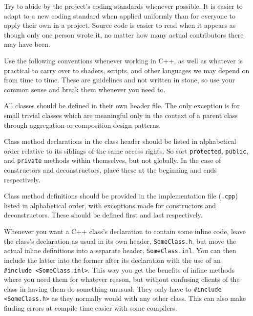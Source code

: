 

Try to abide by the project's coding standards whenever possible. It is easier to adapt to a new coding standard when applied uniformly than for everyone to apply their own in a project. Source code is easier to read when it appears as though only one person wrote it, no matter how many actual contributors there may have been.

Use the following conventions whenever working in C++, as well as whatever is practical to carry over to shaders, scripts, and other languages we may depend on from time to time. These are guidelines and not written in stone, so use your common sense and break them whenever you need to.


\startitemize[4]
\item
All classes should be defined in their own header file. The only exception is for small trivial classes which are meaningful only in the context of a parent class through aggregation or composition design patterns.

\item
Class method declarations in the class header should be listed in alphabetical order relative to its siblings of the same access rights. So sort {\tt protected}, {\tt public}, and {\tt private} methods within themselves, but not globally. In the case of constructors and deconstructors, place these at the beginning and ends respectively.

\item
Class method definitions should be provided in the implementation file ({\tt *.cpp}) listed in alphabetical order, with exceptions made for constructors and deconstructors. These should be defined first and last respectively.

\item
Whenever you want a C++ class's declaration to contain some inline code, leave the class's declaration as usual in its own header, {\tt SomeClass.h}, but move the actual inline definitions into a separate header, {\tt SomeClass.inl}. You can then include the latter into the former after its declaration with the use of an {\tt \#include <SomeClass.inl>}. This way you get the benefits of inline methods where you need them for whatever reason, but without confusing clients of the class in having them do something unusual. They only have to {\tt \#include <SomeClass.h>} as they normally would with any other class. This can also make finding errors at compile time easier with some compilers.
\stopitemize

